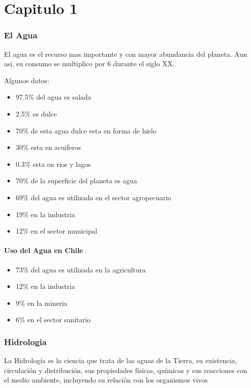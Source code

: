 \part{Capitulo 1}

\section{El Agua}

El agua es el recurso mas importante y con mayor abundancia del planeta.
Aun asi, su consumo se multiplico por 6 durante el siglo XX.

Algunos datos:

\begin{itemize}
    \item 97.5\% del agua es salada
    \item 2.5\% es dulce
    \item 70\% de esta agua dulce esta en forma de hielo
    \item 30\% esta en acuiferos
    \item 0.3\% esta en rios y lagos
    \item 70\% de la superficie del planeta es agua
    \item 69\% del agua es utilizada en el sector agropecuario
    \item 19\% en la industria
    \item 12\% en el sector municipal
\end{itemize}

\subsection{Uso del Agua en Chile}

\begin{itemize}
    \item 73\% del agua es utilizada en la agricultura
    \item 12\% en la industria
    \item 9\% en la mineria
    \item 6\% en el sector sanitario
\end{itemize}

\section{Hidrologia}

La Hidrología es la ciencia que trata de las aguas de la
Tierra, su existencia, circulación y distribución, sus
propiedades físicas, químicas y sus reacciones con el medio
ambiente, incluyendo su relación con los organismos vivos

